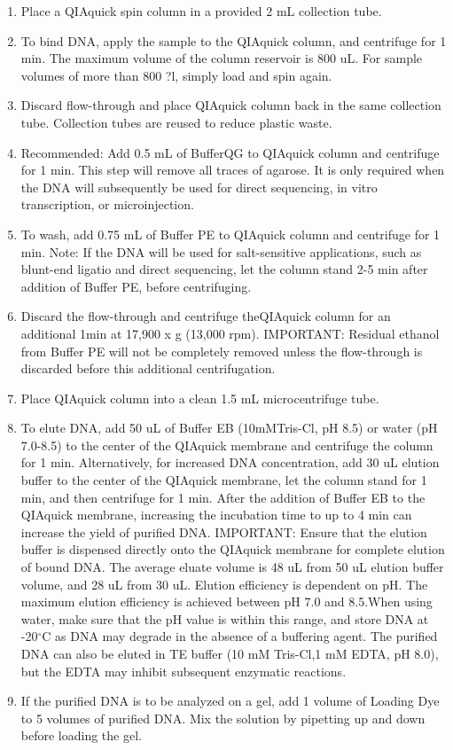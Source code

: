 \documentclass[11pt, oneside]{article}
\begin{document}
\begin{enumerate}
				\item Place a QIAquick spin column in a provided 2 mL collection tube.
				\item To bind DNA, apply the sample to the QIAquick column, and centrifuge for 1 min. The maximum volume of the column reservoir is 				800 uL. For sample volumes of more than 800 ?l, simply load and spin again.
				\item Discard flow-through and place QIAquick column back in the same collection tube. Collection tubes are reused to reduce plastic 				waste.
				\item Recommended: Add 0.5 mL of BufferQG to QIAquick column and centrifuge for 1 min. This step will remove all traces of agarose. It 				is only required when the DNA will subsequently be used for direct sequencing, in vitro transcription, or microinjection.
				\item To wash, add 0.75 mL of Buffer PE to QIAquick column and centrifuge for 1 min. Note: If the DNA will be used for salt-sensitive 				applications, such as blunt-end ligatio and direct sequencing, let the column stand 2-5 min after addition of Buffer PE, before centrifuging.
				\item Discard the flow-through and centrifuge theQIAquick column for an additional 1min at 17,900 x g (13,000 rpm). IMPORTANT: 					Residual ethanol from Buffer PE will not be completely removed unless the flow-through is discarded before this additional centrifugation.
				\item Place QIAquick column into a clean 1.5 mL microcentrifuge tube.
				\item To elute DNA, add 50 uL of Buffer EB (10mMTris-Cl, pH 8.5) or water (pH 7.0-8.5) to the center of the QIAquick membrane and 				centrifuge the column for 1 min. Alternatively, for increased DNA concentration, add 30 uL elution buffer to the center of the QIAquick 				membrane, let the column stand for 1 min, and then centrifuge for 1 min. After the addition of Buffer EB to the QIAquick membrane, 					increasing the incubation time to up to 4 min can increase the yield of purified DNA. IMPORTANT: Ensure that the elution buffer is 					dispensed directly onto the QIAquick membrane for complete elution of bound DNA. The average eluate volume is 48 uL from 50 uL 				elution buffer volume, and 28 uL from 30 uL. Elution efficiency is dependent on pH. The maximum elution efficiency is achieved between 				pH 7.0 and 8.5.When using water, make sure that the pH value is within this range, and store DNA at -20$^{\circ}$C as DNA may 					degrade in the absence of a buffering agent. The purified DNA can also be eluted in TE buffer (10 mM Tris-Cl,1 mM EDTA, pH 8.0), but 				the EDTA may inhibit subsequent enzymatic reactions.
				\item If the purified DNA is to be analyzed on a gel, add 1 volume of Loading Dye to 5 volumes of purified DNA. Mix the solution by 					pipetting up and down before loading the gel. 
			\end{enumerate}
\end{document}
